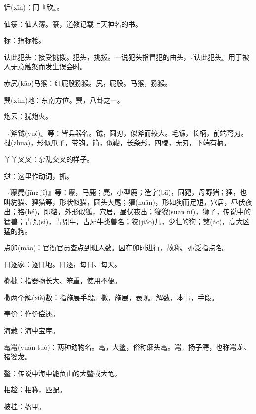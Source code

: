 \startbuffer[131]
忻(xīn)：同『欣』。
\stopbuffer


\startbuffer[132]
仙箓：仙人簿。箓，道教记载上天神名的书。
\stopbuffer


\startbuffer[133]
标：指标枪。
\stopbuffer


\startbuffer[134]
认此犯头：接受挑拨。犯头，挑拨。一说犯头指冒犯的由头，『认此犯头』用于被人无意触怒而发生误会时。
\stopbuffer


\startbuffer[135]
赤尻(kāo)马猴：红屁股猕猴。尻，屁股。马猴，猕猴。
\stopbuffer


\startbuffer[136]
巽(xùn)地：东南方位。巽，八卦之一。
\stopbuffer


\startbuffer[137]
炮云：犹炮火。
\stopbuffer


\startbuffer[138]
『斧钺(yuè)』等：皆兵器名。钺，圆刃，似斧而较大。毛镰，长柄，前端弯刃。挝(zhuā)，形似爪子，带钩。简，似鞭，长条形，四棱，无刃，下端有柄。
\stopbuffer


\startbuffer[139]
丫丫叉叉：杂乱交叉的样子。
\stopbuffer


\startbuffer[140]
挝：这里作动词，抓。
\stopbuffer


\startbuffer[141]
『麖麂(jīng jǐ)』等：麖，马鹿；麂，小型鹿；造字(bā)，同豝，母野猪；狸，也叫豹猫、狸猫等，形状似猫，圆头大尾；獾(huān)，形如狗而足短，穴居，昼伏夜出；狢(hé)，即貉，外形似狐，穴居，昼伏夜出；狻猊(suān ní)，狮子，传说中的猛兽；青兕(sì)，青兕牛，古犀牛类兽名；狡(jiǎo)儿，少壮的狗；獒(áo)，高大凶猛的狗。
\stopbuffer


\startbuffer[142]
点卯(mǎo)：官衙官员查点到班人数。因在卯时进行，故称。亦泛指点名。
\stopbuffer


\startbuffer[143]
日逐家：逐日地。日逐，每日、每天。
\stopbuffer


\startbuffer[144]
榔槺：指器物长大、笨重，使用不便。
\stopbuffer


\startbuffer[145]
撒两个解(xiè)数：指施展手段。撒，施展，表现。解数，本事，手段。
\stopbuffer


\startbuffer[146]
奉价：作价偿还。
\stopbuffer


\startbuffer[147]
海藏：海中宝库。
\stopbuffer


\startbuffer[148]
鼋鼍(yuán tuó)：两种动物名。鼋，大鳖，俗称癞头鼋。鼍，扬子鳄，也称鼍龙、猪婆龙。
\stopbuffer


\startbuffer[149]
鳌：传说中海中能负山的大鳖或大龟。
\stopbuffer


\startbuffer[150]
相趁：相称，匹配。
\stopbuffer


\startbuffer[151]
披挂：盔甲。
\stopbuffer


